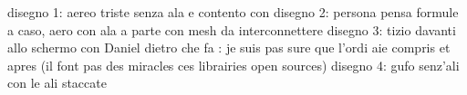 \documentclass[16pt]{article}
\begin{document}
disegno 1: aereo triste senza ala e contento con
disegno 2: persona pensa formule a caso, aero con ala a parte con mesh da interconnettere 
disegno 3: tizio davanti allo schermo con Daniel dietro che fa : je suis pas sure que l'ordi aie compris et apres (il font pas des miracles ces librairies open sources)
disegno 4: gufo senz'ali con le ali staccate
\end{document}

